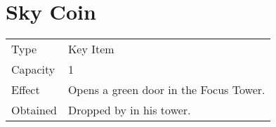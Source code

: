 \section{Sky Coin}
\label{item:sky_coin}


\noindent\begin{tabularx}{\textwidth}[l]{lX}
	Type
	& Key Item
\\ %
	Capacity
	& 1
\\ %
	Effect
	& Opens a green door in the Focus Tower.
\\ %
	Obtained
	& Dropped by \nameref{monster:pazuzu} in his tower.
\end{tabularx}
